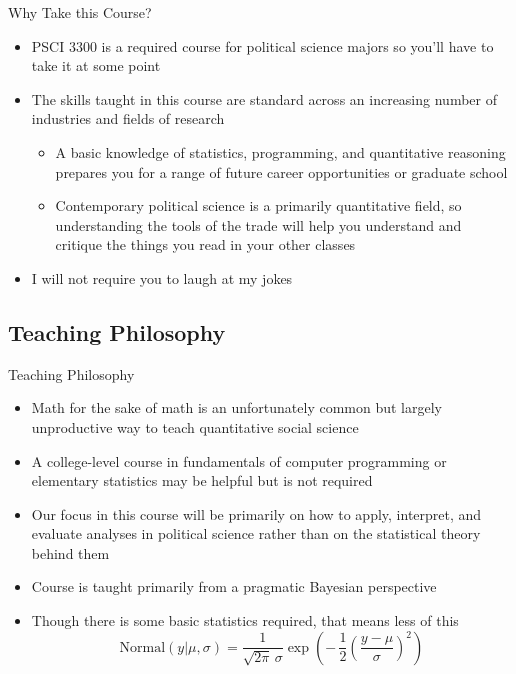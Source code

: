 \documentclass[12pt,ignorenonframetext,aspectratio=169]{beamer}
\begin{document}
\begin{frame}{Why Take this Course?}
\begin{itemize}[<+->]
\item
  PSCI 3300 is a required course for political science majors so you'll
  have to take it at some point
\item
  The skills taught in this course are standard across an increasing
  number of industries and fields of research

  \begin{itemize}[<+->]
  \item
    A basic knowledge of statistics, programming, and quantitative
    reasoning prepares you for a range of future career opportunities or
    graduate school
  \item
    Contemporary political science is a primarily quantitative field, so
    understanding the tools of the trade will help you understand and
    critique the things you read in your other classes
  \end{itemize}
\item
  I will not require you to laugh at my jokes
\end{itemize}
\end{frame}

\hypertarget{teaching-philosophy}{%
\subsection{Teaching Philosophy}\label{teaching-philosophy}}

\begin{frame}{Teaching Philosophy}
\begin{itemize}[<+->]
\item
  Math for the sake of math is an unfortunately common but largely
  unproductive way to teach quantitative social science
\item
  A college-level course in fundamentals of computer programming or
  elementary statistics may be helpful but is not required
\item
  Our focus in this course will be primarily on how to apply, interpret,
  and evaluate analyses in political science rather than on the
  statistical theory behind them
\item
  Course is taught primarily from a pragmatic Bayesian perspective
\item
  Though there is some basic statistics required, that means less of
  this
  \[\text{Normal}(y|\mu,\sigma) = \frac{1}{\sqrt{2 \pi}\, \sigma} \exp\left( - \, \frac{1}{2}\left(\frac{y -\mu}{\sigma} \right)^2 \right)\]
\end{itemize}
\end{frame}
\end{document}
